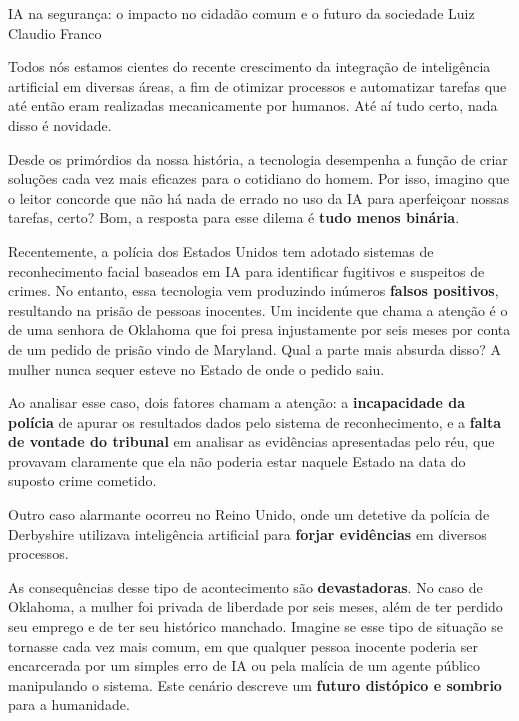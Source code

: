 \hypearticle
{IA na segurança: o impacto no cidadão comum e o futuro da sociedade}
{Luiz Claudio Franco}
{

Todos nós estamos cientes do recente crescimento da integração de inteligência artificial em diversas áreas, a fim de otimizar processos e automatizar tarefas que até então eram realizadas mecanicamente por humanos. Até aí tudo certo, nada disso é novidade.\par

Desde os primórdios da nossa história, a tecnologia desempenha a função de criar soluções cada vez mais eficazes para o cotidiano do homem. Por isso, imagino que o leitor concorde que não há nada de errado no uso da IA para aperfeiçoar nossas tarefas, certo? Bom, a resposta para esse dilema é \textbf{tudo menos binária}.\par

Recentemente, a polícia dos Estados Unidos tem adotado sistemas de reconhecimento facial baseados em IA para identificar fugitivos e suspeitos de crimes. No entanto, essa tecnologia vem produzindo inúmeros \textbf{falsos positivos}, resultando na prisão de pessoas inocentes. Um incidente que chama a atenção é o de uma senhora de Oklahoma que foi presa injustamente por seis meses por conta de um pedido de prisão vindo de Maryland. Qual a parte mais absurda disso? A mulher nunca sequer esteve no Estado de onde o pedido saiu.\par

Ao analisar esse caso, dois fatores chamam a atenção: a \textbf{incapacidade da polícia} de apurar os resultados dados pelo sistema de reconhecimento, e a \textbf{falta de vontade do tribunal} em analisar as evidências apresentadas pelo réu, que provavam claramente que ela não poderia estar naquele Estado na data do suposto crime cometido.\par

Outro caso alarmante ocorreu no Reino Unido, onde um detetive da polícia de Derbyshire utilizava inteligência artificial para \textbf{forjar evidências} em diversos processos.\par

As consequências desse tipo de acontecimento são \textbf{devastadoras}. No caso de Oklahoma, a mulher foi privada de liberdade por seis meses, além de ter perdido seu emprego e de ter seu histórico manchado. Imagine se esse tipo de situação se tornasse cada vez mais comum, em que qualquer pessoa inocente poderia ser encarcerada por um simples erro de IA ou pela malícia de um agente público manipulando o sistema. Este cenário descreve um \textbf{futuro distópico e sombrio} para a humanidade.\par

}
